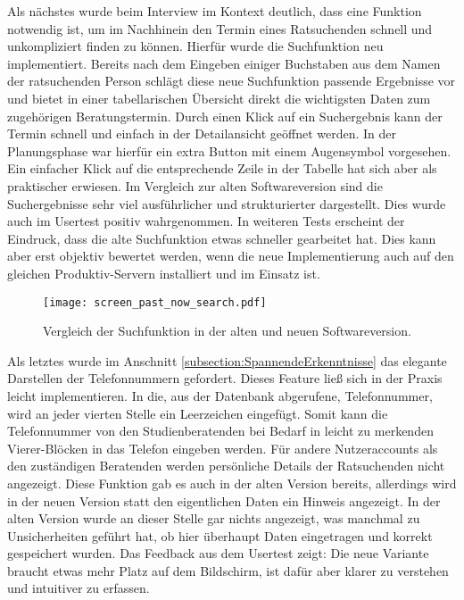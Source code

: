 Als nächstes wurde beim Interview im Kontext deutlich, dass eine Funktion
notwendig ist, um im Nachhinein den Termin eines Ratsuchenden schnell und
unkompliziert finden zu können. Hierfür wurde die Suchfunktion neu
implementiert. Bereits nach dem Eingeben einiger Buchstaben aus dem Namen der
ratsuchenden Person schlägt diese neue Suchfunktion passende Ergebnisse vor und
bietet in einer tabellarischen Übersicht direkt die wichtigsten Daten zum
zugehörigen Beratungstermin. Durch einen Klick auf ein Suchergebnis kann der
Termin schnell und einfach in der Detailansicht geöffnet werden. In der
Planungsphase war hierfür ein extra Button mit einem Augensymbol vorgesehen.
Ein einfacher Klick auf die entsprechende Zeile in der Tabelle hat sich aber
als praktischer erwiesen. Im Vergleich zur alten Softwareversion sind die
Suchergebnisse sehr viel ausführlicher und strukturierter dargestellt. Dies
wurde auch im Usertest positiv wahrgenommen. In weiteren Tests erscheint der
Eindruck, dass die alte Suchfunktion etwas schneller gearbeitet hat. Dies kann
aber erst objektiv bewertet werden, wenn die neue Implementierung auch auf den
gleichen Produktiv-Servern installiert und im Einsatz ist.

\begin{figure}[H]
    \caption{Vergleich der Suchfunktion in der alten und neuen Softwareversion.}
    \centering
    \texttt{[image: screen\_past\_now\_search.pdf]}
\end{figure}

Als letztes wurde im Anschnitt \ref{subsection:SpannendeErkenntnisse} das
elegante Darstellen der Telefonnummern gefordert. Dieses Feature ließ sich in
der Praxis leicht implementieren. In die, aus der Datenbank abgerufene,
Telefonnummer, wird an jeder vierten Stelle ein Leerzeichen eingefügt. Somit
kann die Telefonnummer von den Studienberatenden bei Bedarf in leicht zu
merkenden Vierer-Blöcken in das Telefon eingeben werden. Für andere
Nutzeraccounts als den zuständigen Beratenden werden persönliche Details der
Ratsuchenden nicht angezeigt. Diese Funktion gab es auch in der alten Version
bereits, allerdings wird in der neuen Version statt den eigentlichen Daten ein
Hinweis angezeigt. In der alten Version wurde an dieser Stelle gar nichts
angezeigt, was manchmal zu Unsicherheiten geführt hat, ob hier überhaupt Daten
eingetragen und korrekt gespeichert wurden. Das Feedback aus dem Usertest
zeigt: Die neue Variante braucht etwas mehr Platz auf dem Bildschirm, ist dafür
aber klarer zu verstehen und intuitiver zu erfassen.


